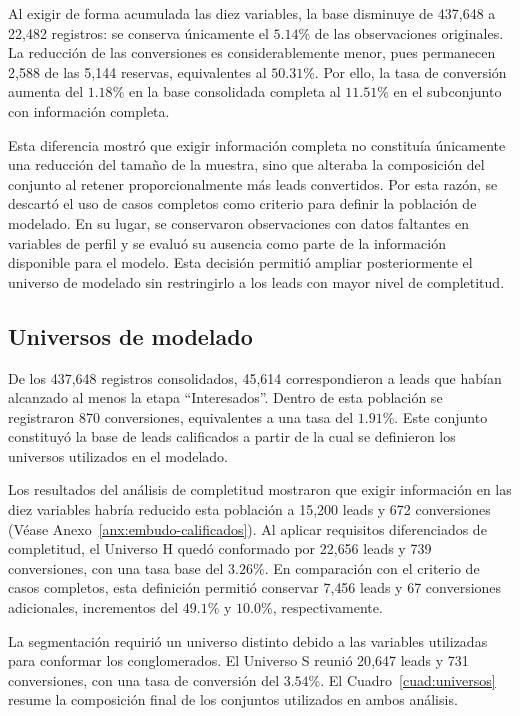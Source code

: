 Al exigir de forma acumulada las diez variables, la base disminuye de 437{,}648 a 22{,}482 registros: se conserva únicamente el $5.14\%$ de las observaciones originales. La reducción de las conversiones es considerablemente menor, pues permanecen 2{,}588 de las 5{,}144 reservas, equivalentes al $50.31\%$. Por ello, la tasa de conversión aumenta del $1.18\%$ en la base consolidada completa al $11.51\%$ en el subconjunto con información completa.

Esta diferencia mostró que exigir información completa no constituía únicamente una reducción del tamaño de la muestra, sino que alteraba la composición del conjunto al retener proporcionalmente más leads convertidos. Por esta razón, se descartó el uso de casos completos como criterio para definir la población de modelado. En su lugar, se conservaron observaciones con datos faltantes en variables de perfil y se evaluó su ausencia como parte de la información disponible para el modelo. Esta decisión permitió ampliar posteriormente el universo de modelado sin restringirlo a los leads con mayor nivel de completitud.


\subsection{Universos de modelado}
\label{subsec:universo-h-resultados}

De los 437{,}648 registros consolidados, 45{,}614 correspondieron a leads que habían alcanzado al menos la etapa ``Interesados''. Dentro de esta población se registraron 870 conversiones, equivalentes a una tasa del $1.91\%$. Este conjunto constituyó la base de leads calificados a partir de la cual se definieron los universos utilizados en el modelado.

Los resultados del análisis de completitud mostraron que exigir información en las diez variables habría reducido esta población a 15{,}200  leads y 672 conversiones (Véase Anexo~\ref{anx:embudo-calificados}). Al aplicar requisitos diferenciados de completitud, el Universo H quedó conformado por 22{,}656 leads y 739 conversiones, con una tasa base del $3.26\%$. En comparación con el criterio de casos completos, esta definición permitió conservar 7{,}456 leads y 67 conversiones adicionales, incrementos del $49.1\%$ y $10.0\%$, respectivamente.

La segmentación requirió un universo distinto debido a las variables utilizadas para conformar los conglomerados. El Universo S reunió 20{,}647 leads y 731 conversiones, con una tasa de conversión del $3.54\%$. El Cuadro~\ref{cuad:universos} resume la composición final de los conjuntos utilizados en ambos análisis.

